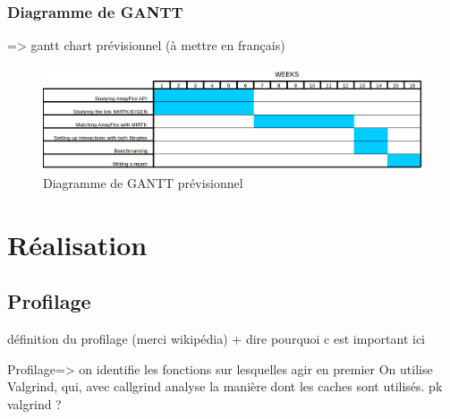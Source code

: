 \documentclass[12pt]{report}
\begin{document}
	
	\subsection{Diagramme de GANTT}
	 => gantt chart prévisionnel (à mettre en français)
	\begin{figure}[h!]
		\begin{center}
			\includegraphics[width=18cm]{Reports/figures/estimated_gantt.png}
		\end{center}	
		\caption{Diagramme de GANTT prévisionnel}
		\label{Diagramme de GANTT prévisionnel}
	\end{figure}
\chapter{Réalisation}
	\section{Profilage}
	définition du profilage (merci wikipédia) + dire pourquoi c est important ici
	
	Profilage=> on identifie les fonctions sur lesquelles agir en premier
	On utilise Valgrind, qui, avec callgrind analyse la manière dont les caches sont utilisés.
	pk valgrind ?
%	
	
\end{document}
